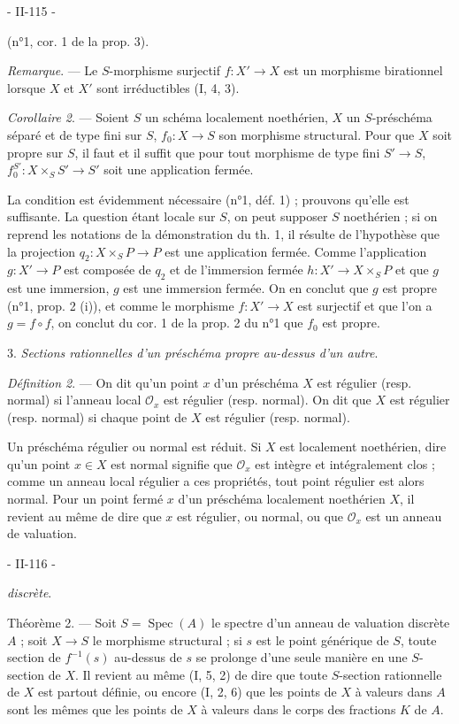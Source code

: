 
- II-115 -

(n°1, cor. 1 de la prop. 3).

\emph{Remarque}. — Le $S$-morphisme surjectif $f : X' \to X$ est un morphisme birationnel lorsque $X$ et $X'$ sont irréductibles (I, 4, 3).

\emph{Corollaire 2}. — Soient $S$ un schéma localement noethérien, $X$ un $S$-préschéma séparé et de type fini sur $S$, $f_0 : X \to S$ son morphisme structural. Pour que $X$ soit propre sur $S$, il faut et il suffit que pour tout morphisme de type fini $S' \to S$, $f_0^{S'} : X \times_S S' \to S'$ soit une application fermée.

La condition est évidemment nécessaire (n°1, déf. 1) ; prouvons qu'elle est suffisante. La question étant locale sur $S$, on peut supposer $S$ noethérien ; si on reprend les notations de la démonstration du th. 1, il résulte de l'hypothèse que la projection $q_2 : X \times_S P \to P$ est une application fermée. Comme l'application $g : X' \to P$ est composée de $q_2$ et de l'immersion fermée $h : X' \to X \times_S P$ et que $g$ est une immersion, $g$ est une immersion fermée. On en conclut que $g$ est propre (n°1, prop. 2 (i)), et comme le morphisme $f : X' \to X$ est surjectif et que l'on a $g = f \circ f$, on conclut du cor. 1 de la prop. 2 du n°1 que $f_0$ est propre.

3. \emph{Sections rationnelles d'un préschéma propre au-dessus d'un autre}.

\emph{Définition 2}. — On dit qu'un point $x$ d'un préschéma $X$ est régulier (resp. normal) si l'anneau local $\mathcal{O}_x$ est régulier (resp. normal). On dit que $X$ est régulier (resp. normal) si chaque point de $X$ est régulier (resp. normal).

Un préschéma régulier ou normal est réduit. Si $X$ est localement noethérien, dire qu'un point $x \in X$ est normal signifie que $\mathcal{O}_x$ est intègre et intégralement clos ; comme un anneau local régulier a ces propriétés, tout point régulier est alors normal. Pour un point fermé $x$ d'un préschéma localement noethérien $X$, il revient au même de dire que $x$ est régulier, ou normal, ou que $\mathcal{O}_x$ est un anneau de valuation.

\newpage


- II-116 -

\emph{discrète}.

Théorème 2. — Soit $S = \operatorname{Spec}(A)$ le spectre d'un anneau de valuation discrète $A$ ; soit $X \to S$ le morphisme structural ; si $s$ est le point générique de $S$, toute section de $f^{-1}(s)$ au-dessus de $s$ se prolonge d'une seule manière en une $S$-section de $X$. 
Il revient au même (I, 5, 2) de dire que toute $S$-section rationnelle de $X$ est partout définie, ou encore (I, 2, 6) que les points de $X$ à valeurs dans $A$ sont les mêmes que les points de $X$ à valeurs dans le corps des fractions $K$ de $A$.

